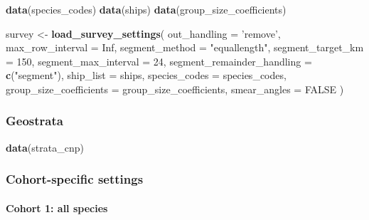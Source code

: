 \documentclass[
]{book}
\newenvironment{Shaded}{\begin{snugshade}}{\end{snugshade}}
\newcommand{\DataTypeTok}[1]{\textcolor[rgb]{0.13,0.29,0.53}{#1}}
\newcommand{\DecValTok}[1]{\textcolor[rgb]{0.00,0.00,0.81}{#1}}
\newcommand{\KeywordTok}[1]{\textcolor[rgb]{0.13,0.29,0.53}{\textbf{#1}}}
\newcommand{\NormalTok}[1]{#1}
\newcommand{\OtherTok}[1]{\textcolor[rgb]{0.56,0.35,0.01}{#1}}
\newcommand{\StringTok}[1]{\textcolor[rgb]{0.31,0.60,0.02}{#1}}
\begin{document}
\begin{Shaded}
\begin{Highlighting}[]
\KeywordTok{data}\NormalTok{(species_codes)}
\KeywordTok{data}\NormalTok{(ships)}
\KeywordTok{data}\NormalTok{(group_size_coefficients)}

\NormalTok{survey <-}\StringTok{ }\KeywordTok{load_survey_settings}\NormalTok{(}
  \DataTypeTok{out_handling =} \StringTok{'remove'}\NormalTok{,}
  \DataTypeTok{max_row_interval =} \OtherTok{Inf}\NormalTok{,}
  \DataTypeTok{segment_method =} \StringTok{"equallength"}\NormalTok{,}
  \DataTypeTok{segment_target_km =} \DecValTok{150}\NormalTok{,}
  \DataTypeTok{segment_max_interval =} \DecValTok{24}\NormalTok{,}
  \DataTypeTok{segment_remainder_handling =} \KeywordTok{c}\NormalTok{(}\StringTok{"segment"}\NormalTok{),}
  \DataTypeTok{ship_list =}\NormalTok{ ships,}
  \DataTypeTok{species_codes =}\NormalTok{ species_codes,}
  \DataTypeTok{group_size_coefficients =}\NormalTok{ group_size_coefficients,}
  \DataTypeTok{smear_angles =} \OtherTok{FALSE}
\NormalTok{)}
\end{Highlighting}
\end{Shaded}

\hypertarget{geostrata-1}{%
\subsubsection*{Geostrata}\label{geostrata-1}}

\begin{Shaded}
\begin{Highlighting}[]
\KeywordTok{data}\NormalTok{(strata_cnp)}
\end{Highlighting}
\end{Shaded}

\hypertarget{cohort-specific-settings-1}{%
\subsubsection*{Cohort-specific settings}\label{cohort-specific-settings-1}}

\hypertarget{cohort-1-all-species}{%
\paragraph{Cohort 1: all species}\label{cohort-1-all-species}}
\end{document}
